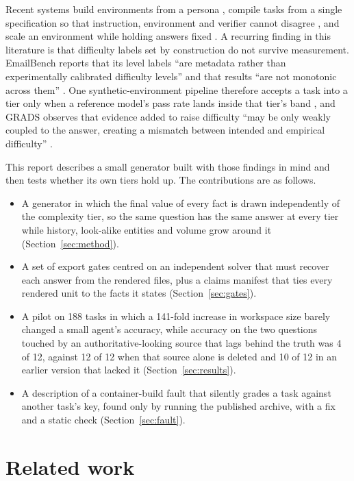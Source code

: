 \documentclass{article}
\begin{document}
Recent systems build environments from a persona \cite{wildawm,mypcbench}, compile tasks from a single specification so that instruction, environment and verifier cannot disagree \cite{anchor}, and scale an environment while holding answers fixed \cite{enterprisebench}. A recurring finding in this literature is that difficulty labels set by construction do not survive measurement. EmailBench reports that its level labels ``are metadata rather than experimentally calibrated difficulty levels'' and that results ``are not monotonic across them'' \cite{emailbench}. One synthetic-environment pipeline therefore accepts a task into a tier only when a reference model's pass rate lands inside that tier's band \cite{generalagent}, and GRADS observes that evidence added to raise difficulty ``may be only weakly coupled to the answer, creating a mismatch between intended and empirical difficulty'' \cite{grads}.

This report describes a small generator built with those findings in mind and then tests whether its own tiers hold up. The contributions are as follows.

\begin{itemize}
  \item A generator in which the final value of every fact is drawn independently of the complexity tier, so the same question has the same answer at every tier while history, look-alike entities and volume grow around it (Section~\ref{sec:method}).
  \item A set of export gates centred on an independent solver that must recover each answer from the rendered files, plus a claims manifest that ties every rendered unit to the facts it states (Section~\ref{sec:gates}).
  \item A pilot on 188 tasks in which a 141-fold increase in workspace size barely changed a small agent's accuracy, while accuracy on the two questions touched by an authoritative-looking source that lags behind the truth was 4 of 12, against 12 of 12 when that source alone is deleted and 10 of 12 in an earlier version that lacked it (Section~\ref{sec:results}).
  \item A description of a container-build fault that silently grades a task against another task's key, found only by running the published archive, with a fix and a static check (Section~\ref{sec:fault}).
\end{itemize}

\section{Related work}
\end{document}
